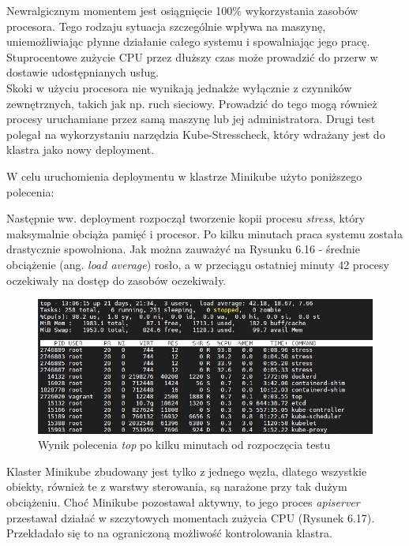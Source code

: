 Newralgicznym momentem jest osiągnięcie 100\% wykorzystania zasobów procesora. Tego rodzaju sytuacja szczególnie wpływa na maszynę, uniemożliwiając płynne działanie całego systemu i spowalniając jego pracę. Stuprocentowe zużycie CPU przez dłuższy czas może prowadzić do przerw w dostawie udostępnianych usług.\\

Skoki w użyciu procesora nie wynikają jednakże wyłącznie z czynników zewnętrznych, takich jak np. ruch sieciowy. Prowadzić do tego mogą również procesy uruchamiane przez samą maszynę lub jej administratora. Drugi test polegał na wykorzystaniu narzędzia Kube-Stresscheck, który wdrażany jest do klastra jako nowy deployment.
\newpage

W celu uruchomienia deploymentu w klastrze Minikube użyto poniższego polecenia:


Następnie ww. deployment rozpoczął tworzenie kopii procesu \textit{stress}, który maksymalnie obciąża pamięć i procesor. Po kilku minutach praca systemu została drastycznie spowolniona. Jak można zauważyć na Rysunku 6.16 - średnie obciążenie (ang. \textit{load average}) rosło, a w przeciągu ostatniej minuty 42 procesy oczekiwały na dostęp do zasobów oczekiwały.

\begin{figure}[H]
    \centering
    \includegraphics[width=1\textwidth]{img/test_two/top.jpg}
    \caption{Wynik polecenia \textit{top} po kilku minutach od rozpoczęcia testu}
\end{figure}

Klaster Minikube zbudowany jest tylko z jednego węzła, dlatego wszystkie obiekty, również te z warstwy sterowania, są narażone przy tak dużym obciążeniu. Choć Minikube pozostawał aktywny, to jego proces \textit{apiserver} przestawał działać w szczytowych momentach zużycia CPU (Rysunek 6.17). Przekładało się to na ograniczoną możliwość kontrolowania klastra.

